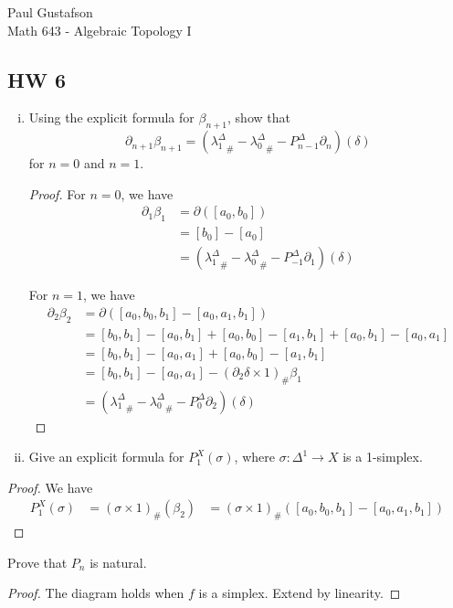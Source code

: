 \documentclass{article}
\begin{document}
\noindent Paul Gustafson\\
\noindent Math 643 - Algebraic Topology I

\subsection*{HW 6}
 \begin{enumerate}[(i)]
\item Using the explicit formula for $\beta_{n+1}$, show that
$$\partial_{n+1} \beta_{n+1} = ( {\lambda_1^\Delta}_\# - {\lambda_0^\Delta}_\# - P^\Delta_{n-1} \partial_n)(\delta)$$
for $n = 0$ and $n=1$.

\begin{proof}

For $n=0$, we have
\begin{align*}
\partial_1 \beta_1 & = \partial ([a_0, b_0]) \\
& = [b_0] - [a_0] \\
& = ( {\lambda_1^\Delta}_\# - {\lambda_0^\Delta}_\# - P^\Delta_{-1} \partial_1)(\delta) 
\end{align*}


For $n=1$, we have 
\begin{align*}
\partial_2 \beta_2 & = \partial ([a_0, b_0, b_1] - [a_0, a_1, b_1]) \\
& = [b_0,b_1] - [a_0,b_1] + [a_0, b_0] - [a_1, b_1] + [a_0, b_1] - [a_0, a_1] \\
& = [b_0,b_1]  - [a_0, a_1] + [a_0, b_0] - [a_1, b_1] \\
& = [b_0,b_1]  - [a_0, a_1] - (\partial_2 \delta \times 1)_\# \beta_1 \\
& = ( {\lambda_1^\Delta}_\# - {\lambda_0^\Delta}_\# - P^\Delta_{0} \partial_2)(\delta) 
\end{align*}
\end{proof}

\item Give an explicit formula for $P_1^X(\sigma)$, where $\sigma: \Delta^1 \to X$ is a 1-simplex.
\end{enumerate}
\begin{proof}
We have 
\begin{align*}
P_1^X(\sigma) & = (\sigma \times 1)_\#(\beta_2)
& = (\sigma \times 1)_\#([a_0,b_0, b_1] - [a_0, a_1, b_1])
\end{align*}
\end{proof}

 Prove that $P_n$ is natural.
\begin{proof}
The diagram holds when $f$ is a simplex.  Extend by linearity.
\end{proof}
\end{document}
